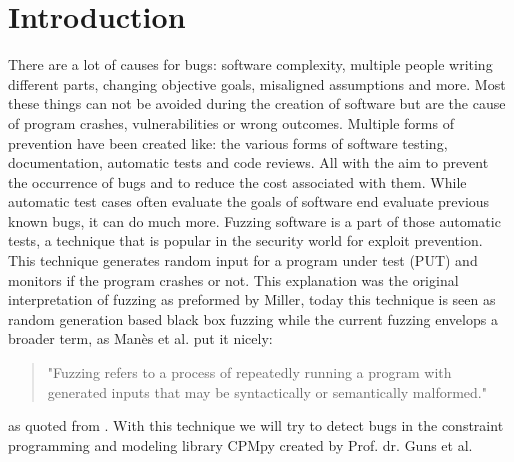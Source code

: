 \chapter{Introduction}
\label{cha:intro}
There are a lot of causes for bugs: software complexity, multiple people writing different parts, changing objective goals, misaligned assumptions and more. Most these things can not be avoided during the creation of software but are the cause of program crashes, vulnerabilities or wrong outcomes. Multiple forms of prevention have been created like: the various forms of software testing, documentation, automatic tests and code reviews. All with the aim to prevent the occurrence of bugs and to reduce the cost associated with them. While automatic test cases often evaluate the goals of software end evaluate previous known bugs, it can do much more. Fuzzing software is a part of those automatic tests, a technique that is popular in the security world for exploit prevention. This technique generates random input for a program under test (PUT) and monitors if the program crashes or not. This explanation was the original interpretation of fuzzing as preformed by Miller\cite{4originalFuzzingUnixUtils}, today this technique is seen as random  generation based black box fuzzing while the current fuzzing envelops a broader term, as Man\`es et al.\cite{13manes2019survey} put it nicely:
\begin{quote}
"Fuzzing refers to a process of repeatedly running a program with generated inputs that may be syntactically or semantically malformed."
\end{quote} as quoted from \cite{13manes2019survey}.
With this technique we will try to detect bugs in the constraint programming and modeling library CPMpy \cite{17guns2019increasing} created by Prof. dr. Guns et al.


